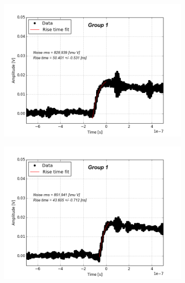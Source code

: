 \documentclass[12pt]{article}
\begin{document}
\begin{figure}[t!]
  \centering
  \begin{subfigure}[t]{0.45\textwidth}
    \centering
    \includegraphics[width=1.2\textwidth]{./graphics/data_0.png}
  \end{subfigure}
  \hfill
  \begin{subfigure}[t]{0.45\textwidth}
    \centering
    \includegraphics[width=1.2\textwidth]{./graphics/data_1.png}
  \end{subfigure}
  \hfill
  \begin{subfigure}[t]{0.45\textwidth}
    \centering

\end{subfigure}
\end{figure}
\end{document}
